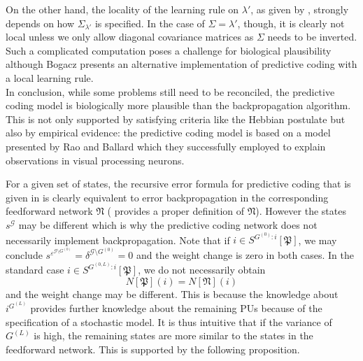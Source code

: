 \documentclass[a4paper,11pt]{report}
\begin{document}
\begin{Par}
On the other hand, the locality of the learning rule on $\lambda'$, as given by , strongly depends on how $\Sigma_{\lambda'}$ is specified. In the case of $\Sigma=\lambda'$, though, it is clearly not local unless we only allow diagonal covariance matrices as $\Sigma$ needs to be inverted. Such a complicated computation poses a challenge for biological plausibility although Bogacz \cite{Bogacz2017} presents an alternative implementation of predictive coding with a local learning rule.\\
In conclusion, while some problems still need to be reconciled, the predictive coding model is biologically more plausible than the backpropagation algorithm. This is not only supported by satisfying criteria like the Hebbian postulate but also by empirical evidence: the predictive coding model is based on a model presented by Rao and Ballard \cite{Rao1999} which they successfully employed to explain observations in visual processing neurons.
\end{Par}

\begin{Par}
For a given set of states, the recursive error formula for predictive coding that is given in  is clearly equivalent to error backpropagation in the corresponding feedforward network $\mathfrak{N}$ ( provides a proper definition of $\mathfrak{N}$). However the states $s^{\mathcal{G}}$ may be different which is why the predictive coding network does not necessarily implement backpropagation. Note that if $i\in S^{G^{(0)}:i}[\mathfrak{P}]$, we may conclude $s^{\varepsilon^{\mathcal{G}\setminus G^{(0)}}}=\delta^{\mathcal{G}\setminus G^{(0)}}=0$ and the weight change is zero in both cases. In the standard case $i\in S^{G^{(0, L)}:i}[\mathfrak{P}]$, we do not necessarily obtain
\[
N[\mathfrak{P}](i)=N[\mathfrak{N}](i)
\]
and the weight change may be different. This is because the knowledge about $i^{G^{(L)}}$ provides further knowledge about the remaining PUs because of the specification of a stochastic model. It is thus intuitive that if the variance of $G^{(L)}$ is high, the remaining states are more similar to the states in the feedforward network. This is supported by the following proposition.
\end{Par}
\end{document}
